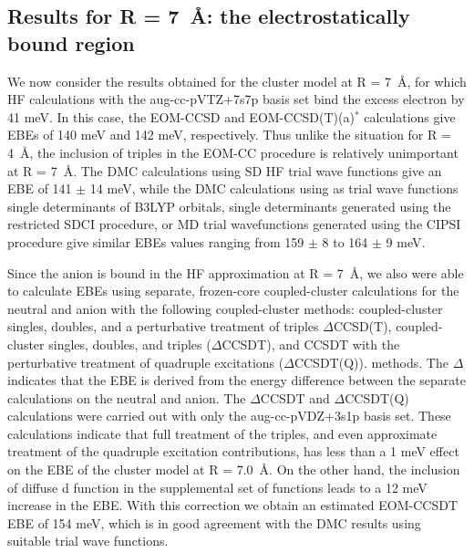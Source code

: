 \subsection{Results for R = \SI{7}{\angstrom}: the electrostatically bound region}

We now consider the results obtained for the  cluster model at R = \SI{7}{\angstrom}, for which HF calculations with the aug-cc-pVTZ+7s7p basis set bind the excess electron by 41 meV.
In this case, the EOM-CCSD and EOM-CCSD(T)(a)$^{*}$ calculations give EBEs of 140 meV and 142 meV, respectively.
Thus unlike the situation for R = \SI{4}{\angstrom}, the inclusion of triples in the EOM-CC procedure is relatively unimportant at R = \SI{7}{\angstrom}.
The DMC calculations using SD HF trial wave functions give an EBE of 141 $\pm$ 14 meV, while the DMC calculations using as trial wave functions single determinants of B3LYP orbitals, single determinants generated using the restricted SDCI procedure, or MD trial wavefunctions generated using the CIPSI procedure give similar EBEs values ranging  from 159 $\pm$ 8 to 164 $\pm$ 9 meV. 

Since the anion is bound in the HF approximation at R = \SI{7}{\angstrom}, we also were able to calculate EBEs using separate, frozen-core coupled-cluster calculations for the neutral and anion with the following coupled-cluster methods: coupled-cluster singles, doubles, and a perturbative treatment of triples $\Delta$CCSD(T)\cite{CCSDpT}, coupled-cluster singles, doubles, and triples ($\Delta$CCSDT)\cite{deltaccsd,CCSDT1,CCSDT2,CCSDT3}, and CCSDT with the perturbative treatment of quadruple excitations ($\Delta$CCSDT(Q)).\cite{CCSDTpQ1} methods.
The $\Delta$ indicates that the EBE is derived from the energy difference between the separate calculations on the neutral and anion. The $\Delta$CCSDT and $\Delta$CCSDT(Q) calculations were carried out with only the aug-cc-pVDZ+3s1p basis set.
These calculations indicate that full treatment of the triples, and even approximate treatment of the quadruple excitation contributions, has less than a 1 meV effect on the EBE of the  cluster model at R = \SI{7.0}{\angstrom}.
On the other hand, the inclusion of diffuse d function in the supplemental set of functions leads to a 12 meV increase in the EBE. With this correction we obtain an estimated EOM-CCSDT EBE of 154 meV, which is in good agreement with the DMC results using suitable trial wave functions.

